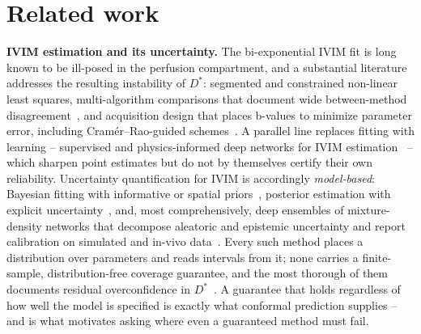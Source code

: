 \documentclass[11pt]{article}
\newcommand{\Dstar}{D^{*}}
\begin{document}
\section{Related work}\label{sec:related}
\textbf{IVIM estimation and its uncertainty.} The bi-exponential IVIM fit is long
known to be ill-posed in the perfusion compartment, and a substantial literature
addresses the resulting instability of $\Dstar$: segmented and constrained
non-linear least squares, multi-algorithm comparisons that document wide
between-method disagreement~\citep{gurneychampion2018}, and acquisition design that
places b-values to minimize parameter error, including Cram\'er--Rao-guided
schemes~\citep{lemke2011}. A parallel line replaces fitting with learning --
supervised and physics-informed deep networks for IVIM
estimation~\citep{barbieri2020,kaandorp2021,mastropietro2022} -- which sharpen
point estimates but do not by themselves certify their own reliability.
Uncertainty quantification for IVIM is accordingly \emph{model-based}: Bayesian
fitting with informative or spatial priors~\citep{gustafsson2018,spinner2021},
posterior estimation with explicit uncertainty~\citep{zhang2019}, and, most
comprehensively, deep ensembles of mixture-density networks that decompose
aleatoric and epistemic uncertainty and report calibration on simulated and in-vivo
data~\citep{casali2026}. Every such method places a distribution over parameters
and reads intervals from it; none carries a finite-sample, distribution-free
coverage guarantee, and the most thorough of them documents residual overconfidence
in $\Dstar$~\citep{casali2026}. A guarantee that holds regardless of how well the
model is specified is exactly what conformal prediction supplies -- and is what
motivates asking where even a guaranteed method must fail.
\end{document}

